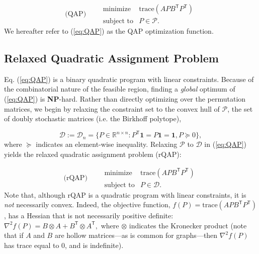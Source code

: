 \documentclass[10pt]{article}
\providecommand{\mc}[1]{\mathcal{#1}}
\providecommand{\mb}[1]{\boldsymbol{#1}}
\providecommand{\mc}[1]{\mathcal{#1}}
\providecommand{\mb}[1]{\boldsymbol{#1}}
\newcommand{\T}{^{\ensuremath{\mathsf{T}}}}
\begin{document}
\begin{equation}
\text{(QAP)} \qquad  
\begin{array}{cl}
			\text{minimize}   & \text{trace}(APB\T P\T) \\
			\text{subject to}  &P \in \mc{P}.   
\end{array}\label{eq:QAP}
\end{equation}
We hereafter refer to (\ref{eq:QAP}) as the QAP optimization function.


\subsection{Relaxed Quadratic Assignment Problem}

Eq. (\ref{eq:QAP}) is a binary quadratic program with linear constraints. 
Because of the combinatorial nature of the feasible region, finding a \emph{global} optimum of (\ref{eq:QAP}) is \textbf{NP}-hard.  
Rather than directly optimizing over the permutation matrices, we begin by relaxing the constraint set to the convex hull of $\mc{P}$, the set of doubly stochastic matrices (i.e. the Birkhoff polytope),

$$\mc{D}:=\mc{D}_n=\{P\in \mathbb{R}^{n\times n} : P\T \mb{1} =  P \mb{1} = \mb{1}, P\succeq 0 \},$$ where $\succeq$ indicates an element-wise inequality. Relaxing $\mathcal{P}$ to $\mc{D}$ in (\ref{eq:QAP}) yields the relaxed quadratic assignment problem (rQAP):

\begin{equation}
\text{(rQAP)} \qquad  
\begin{array}{cl}
			\text{minimize}   & \text{trace}(APB\T P\T) \\
			\text{subject to}  &P \in \mc{D}.   
\end{array}\label{eq:rQAP}
\end{equation}
Note that, although rQAP is a quadratic program with linear constraints, it is {\it not} necessarily convex.  Indeed, the objective function, $f(P)= \text{trace}(APB\T P\T)$, has a Hessian that is not necessarily positive definite:
	$\nabla^2 f(P)  =   B \otimes A + B\T \otimes A\T,$
where $\otimes$ indicates the Kronecker product (note that if $A$ and $B$ are hollow matrices---as is common for graphs---then $\nabla^2 f(P)$ has trace equal to 0, and is indefinite).
\end{document}
